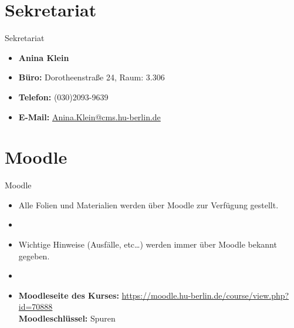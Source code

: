 %
\section{Sekretariat}

\begin{frame}{Sekretariat}
	
\begin{itemize}
	\item[] \textbf{Anina Klein}	
	\item \textbf{Büro:} Dorotheenstraße 24, Raum: 3.306
	\item \textbf{Telefon:} (030)2093-9639
	\item \textbf{E-Mail:} \href{mailto:Anina.Klein@cms.hu-berlin.de}{Anina.Klein@cms.hu-berlin.de}
\end{itemize}	

\end{frame}



%
\section{Moodle}	

\begin{frame}{Moodle}

\begin{itemize}
	\item Alle Folien und Materialien werden über Moodle zur Verfügung gestellt.
	\item[]
	\item Wichtige Hinweise (Ausfälle, etc\dots) werden immer über Moodle bekannt gegeben.
	\item[]
	\item \textbf{Moodleseite des Kurses:} \url{https://moodle.hu-berlin.de/course/view.php?id=70888}\\
	\textbf{Moodleschlüssel:} Spuren
\end{itemize}		

\end{frame}

